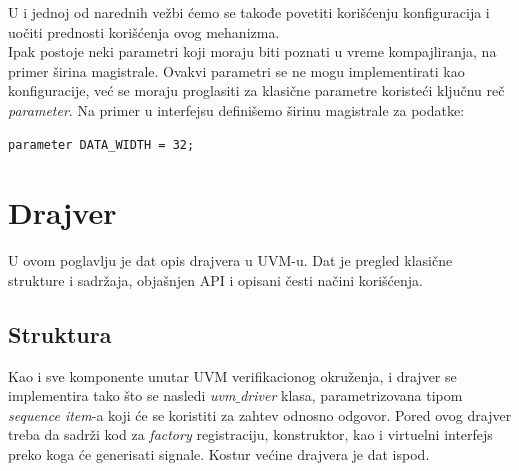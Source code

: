 U i jednoj od narednih vežbi ćemo se takođe povetiti korišćenju konfiguracija i
uočiti prednosti korišćenja ovog mehanizma.\\

Ipak postoje neki parametri koji moraju biti poznati u vreme kompajliranja, na
primer širina magistrale. Ovakvi parametri se ne mogu implementirati kao
konfiguracije, već se moraju proglasiti za klasične parametre koristeći ključnu
reč \emph{parameter}. Na primer u interfejsu definišemo širinu magistrale za
podatke:

\begin{lstlisting}
parameter DATA_WIDTH = 32;
\end{lstlisting}


\section{Drajver}

U ovom poglavlju je dat opis drajvera u UVM-u. Dat je pregled klasične strukture
i sadržaja, objašnjen API i opisani česti načini korišćenja.


\subsection{Struktura}

Kao i sve komponente unutar UVM verifikacionog okruženja, i drajver se
implementira tako što se nasledi \emph{uvm\(\_\)driver} klasa, parametrizovana
tipom \emph{sequence item}-a koji će se koristiti za zahtev odnosno odgovor.
Pored ovog drajver treba da sadrži kod za \emph{factory} registraciju,
konstruktor, kao i virtuelni interfejs preko koga će generisati signale. Kostur
većine drajvera je dat ispod.

